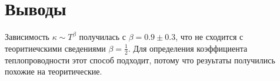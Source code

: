 \section{Выводы}
Зависимость $\kappa \sim T^\beta$ получилась с $\beta = 0.9 \pm 0.3$, что не сходится с теоритиечскими сведениями $\beta = \frac 1 2$. Для определения коэффициента теплопроводности этот способ подходит, потому что резуьтаты получились похожие на теоритические.
